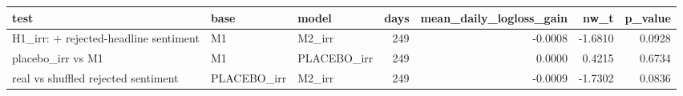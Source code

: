 \begin{tabular}{lllrrrr}
\toprule
test & base & model & days & mean\_daily\_logloss\_gain & nw\_t & p\_value \\
\midrule
H1\_irr: + rejected-headline sentiment & M1 & M2\_irr & 249 & -0.0008 & -1.6810 & 0.0928 \\
placebo\_irr vs M1 & M1 & PLACEBO\_irr & 249 & 0.0000 & 0.4215 & 0.6734 \\
real vs shuffled rejected sentiment & PLACEBO\_irr & M2\_irr & 249 & -0.0009 & -1.7302 & 0.0836 \\
\bottomrule
\end{tabular}
